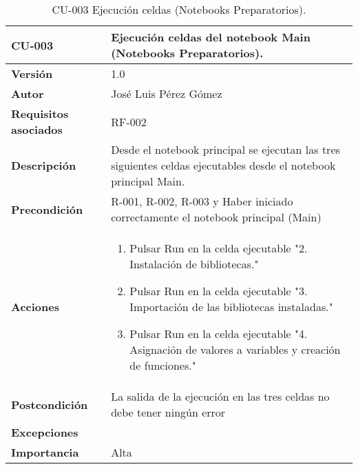 \begin{table}[p]
	\centering
	\begin{tabularx}{\linewidth}{ p{} p{} }
		\toprule
		\textbf{CU-003}    & \textbf{Ejecución celdas del notebook Main (Notebooks Preparatorios).}\\
		\toprule
		\textbf{Versión}              & 1.0    \\
		\textbf{Autor}                & José Luis Pérez Gómez \\
		\textbf{Requisitos asociados} & RF-002 \\
		\textbf{Descripción}          & Desde el notebook principal se ejecutan las tres siguientes celdas ejecutables desde el notebook principal Main. \\
		\textbf{Precondición}         & R-001, R-002, R-003 y Haber iniciado correctamente el notebook principal (Main)\\
		\textbf{Acciones}             &
		\begin{enumerate}
			\def\labelenumi{\arabic{enumi}.}
			\tightlist
			\item Pulsar Run en la celda ejecutable "2. Instalación de bibliotecas."
			\item Pulsar Run en la celda ejecutable "3. Importación de las bibliotecas instaladas."
			\item Pulsar Run en la celda ejecutable "4. Asignación de valores a variables y creación de funciones."
		\end{enumerate}\\
		\textbf{Postcondición}        & La salida de la ejecución en las tres celdas no debe tener ningún error\\
		\textbf{Excepciones}          &  \\
		\textbf{Importancia}          & Alta \\
		\bottomrule
	\end{tabularx}
	\caption{CU-003 Ejecución celdas (Notebooks Preparatorios).}
\end{table}

